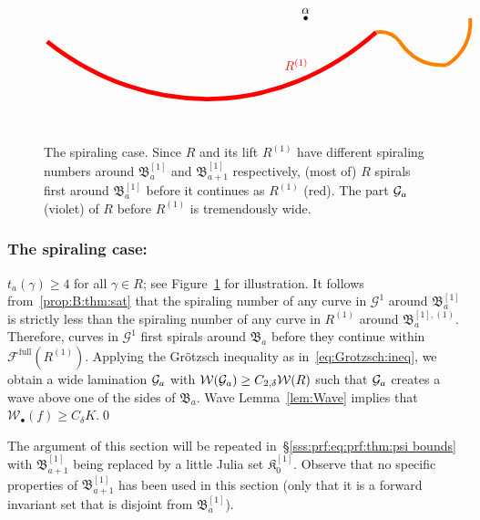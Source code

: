 \documentclass{amsart}
\newcommand\full{{\operatorname{full}}}
\newcommand{\filled}{{\mathfrak K }}
\newcommand{\bush}{{\mathfrak B }}
\newcommand{\1}{{\mathbb 1 }}
\newcommand{\Fam}{{\mathcal F}}
\newcommand{\FamG}{{\mathcal G}}
\newcommand{\Width}{{\mathcal W}}
\begin{document}
\begin{figure}[t!]
\[\begin{tikzpicture}[scale=1.3]
\draw[red,line width=1.2mm]  (-1.5,-0.5) edge[bend right=40]  (5.5,-0.3) ;


\node[red,above]at(3.8,-1.2) {$R^{(1)}$};


\begin{scope}[shift={(8,0)},scale=-1]
\draw[orange,line width=1mm] (0.5,0) edge[bend left]  (1,1);

\draw[orange,line width=1mm] (1,1) edge[bend left]  (2,0.5);


\draw[orange,line width=1mm] (2,0.5) edge[bend right]  (2.5,0.3);
\end{scope}

\filldraw  (4,0) circle (0.04 cm);
\node[above] at (4,0) {$\alpha$};

\end{tikzpicture}\]
\caption{The spiraling case. Since $R$ and its lift  $R^{(1)}$  have different spiraling numbers around $\bush^{[1]}_a$ and  $\bush^{[1]}_{a+1}$ respectively, (most of) $R$ spirals first around $\bush^{[1]}_a$ before it continues as $R^{(1)}$ (red). The part ${\mathcal G}_a$ (violet) of $R$ before $R^{(1)}$ is tremendously wide.}
\label{Fg:spiral}
\end{figure}

\subsubsection{The spiraling case:} $t_a(\gamma)\ge 4$ for all $\gamma\in R$; see Figure~\ref{Fg:spiral} for illustration. It follows from~\ref{prop:B:thm:sat} that the spiraling number of any curve in $\FamG^1$ around $\bush^{[1]}_a$ is strictly less than the spiraling number of any curve in $R^{(1)}$ around $\bush^{[1],(1)}_a$. Therefore, curves in $\FamG^1$ first spirals around $\bush_a$ before they continue within $\Fam^\full( R^{(1)})$. Applying the Gr\"otzsch inequality as in~\eqref{eq:Grotzsch:ineq}, we obtain a wide lamination ${\mathcal G}_a$ with $\Width(\GG_a)\ge C_{2,\delta} \Width(R)$ such that ${\mathcal G}_a$ creates a wave above one of the sides of $\bush_a$. Wave Lemma~\ref{lem:Wave} implies that $\Width_\bullet(f)\ge C_\delta K$.\qed

\begin{rem}\label{rem:about thm:sat case}The argument of this section will be repeated in~\S\ref{sss:prf:eq:prf:thm:psi bounds} with $\bush^{[1]}_{a+1}$ being replaced by a little Julia set $\filled^{[1]}_0$. Observe that no specific properties of $\bush^{[1]}_{a+1}$ has been used in this section (only that it is a forward invariant set that is disjoint from $\bush^{[1]}_a$).
\end{rem}
\end{document}
